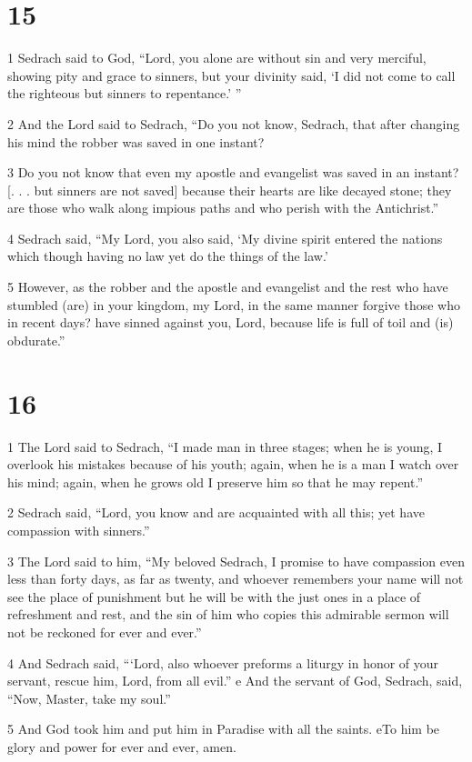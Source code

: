 \chapter{15}

\par 1 Sedrach said to God, “Lord, you alone are without sin and very merciful, showing pity and grace to sinners, but your divinity said, ‘I did not come to call the righteous but sinners to repentance.’ ” 

\par 2 And the Lord said to Sedrach, “Do you not know, Sedrach, that after changing his mind the robber was saved in one instant? 

\par 3 Do you not know that even my apostle and evangelist was saved in an instant? [. . . but sinners are not saved] because their hearts are like decayed stone; they are those who walk along impious paths and who perish with the Antichrist.” 

\par 4 Sedrach said, “My Lord, you also said, ‘My divine spirit entered the nations which though having no law yet do the things of the law.’ 

\par 5 However, as the robber and the apostle and evangelist and the rest who have stumbled (are) in your kingdom, my Lord, in the same manner forgive those who in recent days? have sinned against you, Lord, because life is full of toil and (is) obdurate.” 

\chapter{16}

\par 1 The Lord said to Sedrach, “I made man in three stages; when he is young, I overlook his mistakes because of his youth; again, when he is a man I watch over his mind; again, when he grows old I preserve him so that he may repent.” 

\par 2 Sedrach said, “Lord, you know and are acquainted with all this; yet have compassion with sinners.” 

\par 3 The Lord said to him, “My beloved Sedrach, I promise to have compassion even less than forty days, as far as twenty, and whoever remembers your name will not see the place of punishment but he will be with the just ones in a place of refreshment and rest, and the sin of him who copies this admirable sermon will not be reckoned for ever and ever.” 

\par 4 And Sedrach said, “‘Lord, also whoever preforms a liturgy in honor of your servant, rescue him, Lord, from all evil.” e And the servant of God, Sedrach, said, “Now, Master, take my soul.” 

\par 5 And God took him and put him in Paradise with all the saints. eTo him be glory and power for ever and ever, amen. 




